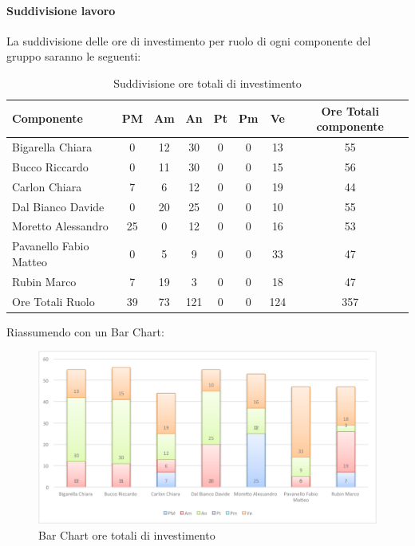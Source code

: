 			\paragraph{Suddivisione lavoro}
				La suddivisione delle ore di investimento per ruolo di ogni componente del gruppo \groupname{} saranno le seguenti:
				\begin{table}[H]
					\begin{center}
						\begin{tabular}{| l | c | c | c | c | c | c | c |}
							\hline
							Componente 				& PM	& Am 	& An 	& Pt 		& Pm 	& Ve 	& Ore Totali componente \\ \hline
							
							Bigarella Chiara 			& 0		& 12 		& 30 		& 0		& 0		& 13 		& 55 \\
							Bucco Riccardo 			& 0		& 11 		& 30 		& 0		& 0		& 15 		& 56 \\
							Carlon Chiara	 			& 7 		& 6 		& 12 		& 0		& 0		& 19 		& 44 \\
							Dal Bianco Davide 			& 0		& 20 		& 25 		& 0		& 0		& 10 		& 55 \\
							Moretto Alessandro 			& 25 		& 0		& 12 		& 0		& 0		& 16 		& 53 \\
							Pavanello Fabio Matteo	 	& 0		& 5 		& 9 		& 0		& 0		& 33 		& 47 \\
							Rubin Marco				& 7 		& 19 		& 3 		& 0		& 0		& 18 		& 47 \\ \hline \hline
							
							Ore Totali Ruolo 			& 39 		& 73 		& 121 	& 0		& 0		& 124 	& 357\\ \hline
						\end{tabular}
					\end{center}
					\caption{Suddivisione ore totali di investimento}
				\end{table}
				Riassumendo con un Bar Chart:
				\begin{figure}[H]\centering
					\includegraphics[width=\textwidth]{PianoDiProgetto/Pics/ChartOreInvest.pdf}
					\caption{Bar Chart ore totali di investimento}
				\end{figure}
